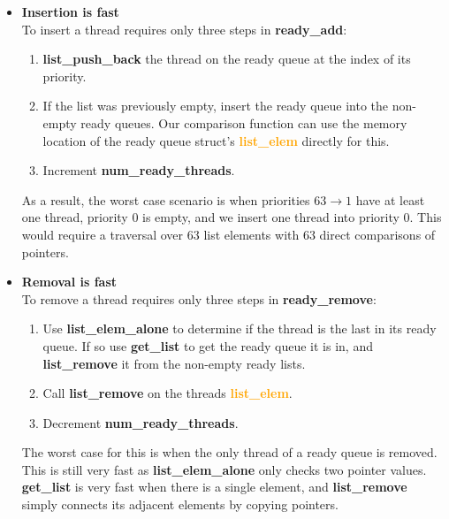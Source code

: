 \documentclass{report}
\newcommand{\bullpara}[2]{\item \textbf{#1} \ #2}
\newcommand{\fun}[1]{\textcolor{Emerald}{\textbf{#1}}}
\newcommand{\struct}[1]{\textcolor{orange}{\textbf{#1}}}
\newcommand{\var}[1]{\textcolor{RoyalPurple}{\textbf{#1}}}
\begin{document}
                \begin{itemize}
                    \bullpara{Insertion is fast}{
                        \\ To insert a thread requires only three steps in \fun{ready\_add}:
                        \begin{enumerate}
                            \item \fun{list\_push\_back} the thread on the ready queue at the index of its priority.
                            \item If the list was previously empty, insert the ready queue into the non-empty ready queues. 
                            Our comparison function can use the memory location of the ready queue struct's \struct{list\_elem} 
                            directly for this.
                            \item Increment \var{num\_ready\_threads}.
                        \end{enumerate}
                        As a result, the worst case scenario is when priorities $63 \to 1$ have at least one thread, 
                        priority $0$ is empty, and we insert one thread into priority $0$. This would require a traversal 
                        over $63$ list elements with $63$ direct comparisons of pointers.
                    }
                    \bullpara{Removal is fast}{
                        \\ To remove a thread requires only three steps in \fun{ready\_remove}:
                        \begin{enumerate}
                            \item Use \fun{list\_elem\_alone} to determine if the thread is the last in its ready queue. 
                            If so use \fun{get\_list} to get the ready queue it is in, and \fun{list\_remove} it from the 
                            non-empty ready lists.
                            \item Call \fun{list\_remove} on the threads \struct{list\_elem}.
                            \item Decrement \var{num\_ready\_threads}.
                        \end{enumerate}
                        The worst case for this is when the only thread of a ready queue is removed. This is still very 
                        fast as \fun{list\_elem\_alone} only checks two pointer values. \fun{get\_list} is very fast when 
                        there is a single element, and \fun{list\_remove} simply connects its adjacent elements by copying pointers.
}
\end{itemize}
\end{document}
